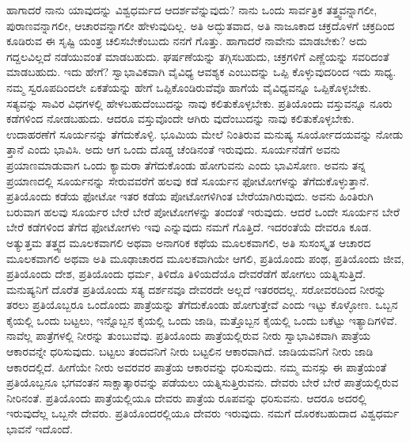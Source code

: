 ಹಾಗಾದರೆ ನಾನು ಯಾವುದನ್ನು ವಿಶ್ವಧರ್ಮದ ಆದರ್ಶವೆನ್ನುವುದು? ನಾನು ಒಂದು ಸಾರ್ವತ್ರಿಕ ತತ್ತ್ವವನ್ನಾಗಲೀ, ಪುರಾಣವನ್ನಾಗಲೀ, ಆಚಾರವನ್ನಾಗಲೀ ಹೇಳುವುದಿಲ್ಲ. ಅತಿ ಅದ್ಭುತವಾದ, ಅತಿ ನಾಜೂಕಾದ ಚಕ್ರದೊಳಗೆ ಚಕ್ರದಿಂದ ಕೂಡಿರುವ ಈ ಸೃಷ್ಟಿ ಯಂತ್ರ ಚಲಿಸಬೇಕೆಂಬುದು ನನಗೆ ಗೊತ್ತು. ಹಾಗಾದರೆ ನಾವೇನು ಮಾಡಬೇಕು? ಅದು ಗದ್ದಲವಿಲ್ಲದೆ ನಡೆಯುವಂತೆ ಮಾಡಬಹುದು. ಘರ್ಷಣೆಯನ್ನು ತಗ್ಗಿಸಬಹುದು, ಚಕ್ರಗಳಿಗೆ ಎಣ್ಣೆಯನ್ನು ಸವರಿದಂತೆ ಮಾಡಬಹುದು. ಇದು ಹೇಗೆ? ಸ್ವಾಭಾವಿಕವಾಗಿ ವೈವಿಧ್ಯ ಆವಶ್ಯಕ ಎಂಬುದನ್ನು ಒಪ್ಪಿ ಕೊಳ್ಳುವುದರಿಂದ ಇದು ಸಾಧ್ಯ. ನಮ್ಮ ಸ್ವರೂಪದಿಂದಲೇ ಏಕತೆಯನ್ನು ಹೇಗೆ ಒಪ್ಪಿಕೊಂಡಿರುವೆವೊ ಹಾಗೆಯೆ ವೈವಿಧ್ಯವನ್ನೂ ಒಪ್ಪಿಕೊಳ್ಳಬೇಕು. ಸತ್ಯವನ್ನು ಸಾವಿರ ವಿಧಗಳಲ್ಲಿ ಹೇಳಬಹುದೆಂಬುದನ್ನು ನಾವು ಕಲಿತುಕೊಳ್ಳಬೇಕು. ಪ್ರತಿಯೊಂದು ವಸ್ತುವನ್ನೂ ನೂರು ಕಡೆಗಳಿಂದ ನೋಡಬಹುದು. ಆದರೂ ವಸ್ತುವೊಂದೇ ಆಗಿರು ವುದೆಂಬುದನ್ನು ನಾವು ಕಲಿತುಕೊಳ್ಳಬೇಕು. ಉದಾಹರಣೆಗೆ ಸೂರ್ಯನನ್ನು ತೆಗೆದುಕೊಳ್ಳಿ. ಭೂಮಿಯ ಮೇಲೆ ನಿಂತಿರುವ ಮನುಷ್ಯ ಸೂರ್ಯೋದಯವನ್ನು ನೋಡು ತ್ತಾನೆ ಎಂದು ಭಾವಿಸಿ. ಅದು ಆಗ ಒಂದು ದೊಡ್ಡ ಚೆಂಡಿನಂತೆ ಇರುವುದು. ಸೂರ್ಯನೆಡೆಗೆ ಅವನು ಪ್ರಯಾಣಮಾಡುವಾಗ ಒಂದು ಕ್ಯಾಮರಾ ತೆಗೆದುಕೊಂಡು ಹೋಗುವನು ಎಂದು ಭಾವಿಸೋಣ. ಅವನು ತನ್ನ ಪ್ರಯಾಣದಲ್ಲಿ ಸೂರ್ಯನನ್ನು ಸೇರುವವರೆಗೆ ಹಲವು ಕಡೆ ಸೂರ್ಯನ ಫೋಟೋಗಳನ್ನು ತೆಗೆದುಕೊಳ್ಳುತ್ತಾನೆ. ಪ್ರತಿಯೊಂದು ಕಡೆಯ ಫೋಟೋ ಇತರ ಕಡೆಯ ಪೋಟೋಗಳಿಗಿಂತ ಬೇರೆಯಾಗಿರುವುದು. ಅವನು ಹಿಂತಿರುಗಿ ಬರುವಾಗ ಹಲವು ಸೂರ್ಯರ ಬೇರೆ ಬೇರೆ ಪೋಟೋಗಳನ್ನು ತಂದಂತೆ ಇರುವುದು. ಆದರೆ ಒಂದೇ ಸೂರ್ಯನ ಬೇರೆ ಬೇರೆ ಕಡೆಗಳಿಂದ ತೆಗೆದ ಫೋಟೋಗಳು ಇವು ಎನ್ನುವುದು ನಮಗೆ ಗೊತ್ತಿದೆ. ಇದರಂತೆಯೆ ದೇವರೂ ಕೂಡ. ಅತ್ಯುತ್ತಮ ತತ್ತ್ವದ ಮೂಲಕವಾಗಲಿ ಅಥವಾ ಅನಾಗರಿಕ ಕಥೆಯ ಮೂಲಕವಾಗಲಿ, ಅತಿ ಸುಸಂಸ್ಕೃತ ಆಚಾರದ ಮೂಲಕವಾಗಲಿ ಅಥವಾ ಅತಿ ಮೂಢಾಚಾರದ ಮೂಲಕವಾಗಿಯೇ ಆಗಲಿ, ಪ್ರತಿಯೊಂದು ಪಂಥ, ಪ್ರತಿಯೊಂದು ಜೀವ, ಪ್ರತಿಯೊಂದು ದೇಶ, ಪ್ರತಿಯೊಂದು ಧರ್ಮ, ತಿಳಿದೊ ತಿಳಿಯದೆಯೊ ದೇವರೆಡೆಗೆ ಹೋಗಲು ಯತ್ನಿಸುತ್ತಿದೆ. ಮನುಷ್ಯನಿಗೆ ದೊರೆತ ಪ್ರತಿಯೊಂದು ಸತ್ಯ ದರ್ಶನವೂ ದೇವರದೇ ಅಲ್ಲದೆ ಇತರರದಲ್ಲ. ಸರೋವರದಿಂದ ನೀರನ್ನು ತರಲು ಪ್ರತಿಯೊಬ್ಬರೂ ಒಂದೊಂದು ಪಾತ್ರೆಯನ್ನು ತೆಗೆದುಕೊಂಡು ಹೋಗುತ್ತೇವೆ ಎಂದು ಇಟ್ಟು ಕೊಳ್ಳೋಣ. ಒಬ್ಬನ ಕೈಯಲ್ಲಿ ಒಂದು ಬಟ್ಟಲು, ಇನ್ನೊಬ್ಬನ ಕೈಯಲ್ಲಿ ಒಂದು ಜಾಡಿ, ಮತ್ತೊಬ್ಬನ ಕೈಯಲ್ಲಿ ಒಂದು ಬಕೆಟ್ಟು ಇತ್ಯಾದಿಗಳಿವೆ. ನಾವೆಲ್ಲ ಪಾತ್ರೆಗಳಲ್ಲಿ ನೀರನ್ನು ತುಂಬುವೆವು. ಪ್ರತಿಯೊಂದು ಪಾತ್ರೆಯಲ್ಲಿರುವ ನೀರು ಸ್ವಾಭಾವಿಕವಾಗಿ ಪಾತ್ರೆಯ ಆಕಾರವನ್ನೇ ಧರಿಸುವುದು. ಬಟ್ಟಲು ತಂದವನಿಗೆ ನೀರು ಬಟ್ಟಲಿನ ಆಕಾರವಾಗಿದೆ. ಜಾಡಿಯವನಿಗೆ ನೀರು ಜಾಡಿ ಆಕಾರದಲ್ಲಿದೆ. ಹೀಗೆಯೇ ನೀರು ಅವರವರ ಪಾತ್ರೆಯ ಆಕಾರವನ್ನು ಧರಿಸುವುದು. ನಮ್ಮ ಮನಸ್ಸು ಈ ಪಾತ್ರೆಯಂತೆ ಪ್ರತಿಯೊಬ್ಬನೂ ಭಗವಂತನ ಸಾಕ್ಷಾತ್ಕಾರವನ್ನು ಪಡೆಯಲು ಯತ್ನಿಸುತ್ತಿರುವನು. ದೇವರು ಬೇರೆ ಬೇರೆ ಪಾತ್ರೆಯಲ್ಲಿರುವ ನೀರಿನಂತೆ. ಪ್ರತಿಯೊಂದು ಪಾತ್ರೆಯಲ್ಲಿಯೂ ದೇವರು ಪಾತ್ರೆಯ ರೂಪವನ್ನು ಧರಿಸುವನು. ಆದರೂ ಅದರಲ್ಲಿ ಇರುವುದೆಲ್ಲ ಒಬ್ಬನೇ ದೇವರು. ಪ್ರತಿಯೊಂದರಲ್ಲಿಯೂ ದೇವರು ಇರುವುದು. ನಮಗೆ ದೊರಕಬಹುದಾದ ವಿಶ್ವಧರ್ಮ ಭಾವನೆ ಇದೊಂದೆ.

